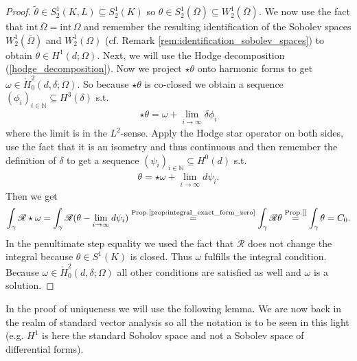 \documentclass[12pt,a4paper]{article}
\numberwithin{equation}{subsection}
\numberwithin{lemma}{subsection}
\theoremstyle{definition}
\newcommand{\naturalnum}{\mathbb{N}}
\newcommand{\omegabar}{\overline{\Omega}}
\newcommand{\rop}{\mathscr{R}} %
\begin{document}
\begin{proof}
    $\tilde{\theta} \in S^1_2(K,L) \subseteq S^1_2(K)$ so 
    $\theta \in S^1_2(\omegabar) \subseteq W^1_2(\omegabar)$.
    We now use the fact that $\text{int}\,\omegabar = \text{int}\,\Omega$ and
    remember the resulting identification of the Sobolev spaces 
    $W^1_2(\omegabar)$ and $W^1_2(\Omega)$ 
    (cf. Remark \ref{rem:identification_sobolev_spaces}) to obtain
    $\theta \in H^1(d;\Omega)$.
    Next, we will use the Hodge decomposition (\ref{hodge_decomposition}).
    Now we project $\star \theta$ onto harmonic forms to get 
    $\omega \in \mathring{H}^2_0(d,\delta;\Omega)$. 
    So because 
    $\star\theta$ is co-closed we 
    obtain a sequence $(\phi_i)_{i \in \naturalnum} \subseteq H^3(\delta)$ s.t.
    \begin{align*}
        \star\theta = \omega + \lim\limits_{i \rightarrow \infty}\delta \phi_i
    \end{align*}
    where the limit is in the $L^2$-sense.
    Apply the Hodge star operator on 
    both sides, use the fact that it is an isometry and thus continuous and then 
    remember the definition of $\delta$ to get a sequence 
    $(\psi_i)_{i \in \naturalnum} \subseteq H^0(d)$ s.t.
    \begin{align*}
        \theta = \star\omega + \lim\limits_{i \rightarrow \infty}d \psi_i.
    \end{align*}    
    Then we get
    \begin{align*}
        \int_\gamma \rop \star \omega 
        =\int_\gamma \rop (\theta - 
        \lim\limits_{i \rightarrow \infty}d \psi_i) 
        \stackrel{  \text{Prop.\ref{prop:integral_exact_form_zero}}  }{=} 
            \int_\gamma \rop \theta 
        \stackrel{  \text{Prop.\ref{}}  }{=}  
            \int_\gamma \theta = C_0.
    \end{align*}
    In the penultimate step equality we used the fact that 
    $\rop$ does not change the integral because $\theta \in S^1(K)$ is closed.
    Thus $\omega$ fulfills the integral condition. 
    Because $\omega \in \mathring{H}^2_0(d,\delta;\Omega)$ all other conditions 
    are satisfied as well and $\omega$ is a solution.
\end{proof}


In the proof of uniqueness we will use the following lemma. 
We are now back in the realm of standard vector analysis so all the notation
is to be seen in this light (e.g. $H^1$ is here the standard Sobolov space 
and not a Sobolev space of differential forms).
\end{document}

